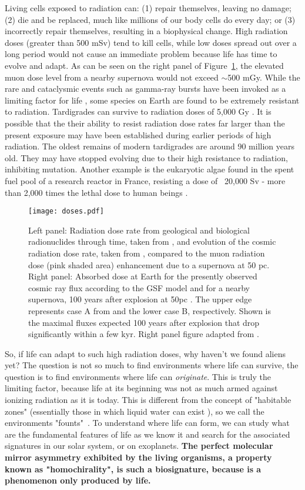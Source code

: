 \documentclass[a4paper,11pt]{article}
\begin{document}
 Living cells exposed to radiation can: (1) repair themselves, leaving no damage; (2) die and be replaced, much like millions of our body cells do every day; or (3) incorrectly repair themselves, resulting in a biophysical change. High radiation doses (greater than 500 mSv) tend to kill cells, while low doses spread out over a long period would not cause an immediate problem because life has time to evolve and adapt. As can be seen on the right panel of Figure~\ref{fig:doses}, the elevated muon dose level from a nearby supernova would not exceed $\sim$500 mGy. While the rare and cataclysmic events such as gamma-ray bursts have been invoked as a limiting factor for life \cite{Ellis95,dar98}, some species on Earth are found to be extremely resistant to radiation. Tardigrades can survive to radiation doses of  5,000 Gy \cite{Horikawa06}. It is possible that the their ability to resist  radiation dose rates far larger than the present exposure  may have been established during earlier periods of high radiation. 
 The oldest remains of modern tardigrades are around 90 million years old. They may have stopped evolving  due to their high resistance to radiation, inhibiting mutation. Another example is the eukaryotic algae found in the spent fuel pool of a research reactor in France,  resisting a dose of ~20,000 Sv - more than 2,000 times the lethal dose to human beings \cite{Farhi08}. 
\begin{figure}
\centering
       \texttt{[image: doses.pdf]}
\caption{ Left panel: Radiation dose rate from geological and biological radionuclides through time, taken from \cite{karam99}, and evolution of the cosmic radiation dose rate, taken from \cite{karam03}, compared to the muon radiation dose (pink shaded area) enhancement due to a supernova at 50 pc. Right panel: Absorbed dose at Earth for the presently observed cosmic ray flux according to the GSF model \cite{Dembinski17}  and for a nearby supernova, 100
years after explosion at 50pc \cite{melott17}. The upper edge represents case A from \cite{melott17} and the lower case B, respectively. Shown is the maximal fluxes expected 100 years after explosion that drop significantly within a few kyr. Right panel figure adapted from \cite{GFB21}.}
\label{fig:doses}
\end{figure}


So, if life can adapt to such high radiation doses, why haven't we found aliens yet? The question is not so much to find environments where life can survive, the question is to find environments where life can \textit{originate}. This is truly the limiting factor, because life at its beginning was not as much armed against ionizing radiation as it is today. This is different from the concept of "habitable zones" (essentially those in which liquid water can exist \cite[][]{Kasting}), so we call the environments  "founts"~\cite{GB20}. To understand where life can form, we can study what are  the fundamental features of life as we know it and search for the associated signatures in our solar system, or on exoplanets.  {\bf The perfect molecular mirror asymmetry exhibited by the living organisms, a property known as "homochirality", is such a biosignature, because is a phenomenon only produced by life. } 
\end{document}
